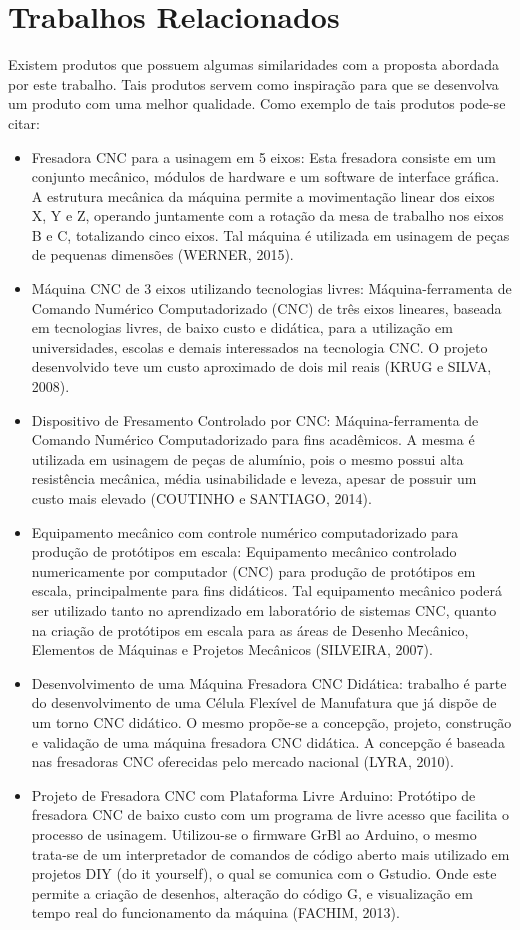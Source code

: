 \section{Trabalhos Relacionados}
Existem produtos que possuem algumas similaridades com a proposta abordada por este trabalho. Tais produtos servem como inspiração para que se desenvolva um produto com uma melhor qualidade. Como exemplo de tais produtos pode-se citar:
\begin{itemize}
\item Fresadora CNC para a usinagem em 5 eixos: Esta fresadora consiste em um conjunto mecânico, módulos de hardware e um software de interface gráfica. A estrutura mecânica da máquina permite a movimentação linear dos eixos X, Y e Z, operando juntamente com a rotação da mesa de trabalho nos eixos B e C, totalizando cinco eixos. Tal máquina é utilizada em usinagem de peças de pequenas dimensões (WERNER, 2015).
\item Máquina CNC de 3 eixos utilizando tecnologias livres: Máquina-ferramenta de Comando Numérico Computadorizado (CNC) de três eixos lineares, baseada em tecnologias livres, de baixo custo e didática, para a utilização em universidades, escolas e demais interessados na tecnologia CNC. O projeto desenvolvido teve um custo aproximado de dois mil reais (KRUG e SILVA, 2008).
\item Dispositivo de Fresamento Controlado por CNC: Máquina-ferramenta de Comando Numérico Computadorizado para fins acadêmicos. A mesma é utilizada em usinagem de peças de alumínio, pois o mesmo possui alta resistência mecânica, média usinabilidade e leveza, apesar de possuir um custo mais elevado (COUTINHO e SANTIAGO, 2014).
\item Equipamento mecânico com controle numérico computadorizado para produção de protótipos em escala: Equipamento mecânico controlado numericamente por computador (CNC) para produção de protótipos em escala, principalmente para fins didáticos. Tal equipamento mecânico poderá ser utilizado tanto no aprendizado em laboratório de sistemas CNC, quanto na criação de protótipos em escala para as áreas de Desenho Mecânico, Elementos de Máquinas e Projetos Mecânicos (SILVEIRA, 2007).
\item Desenvolvimento de uma Máquina Fresadora CNC Didática: trabalho é parte do desenvolvimento de uma Célula Flexível de Manufatura que já dispõe de um torno CNC didático. O mesmo propõe-se a concepção, projeto, construção e validação de uma máquina fresadora CNC didática. A concepção é baseada nas fresadoras CNC oferecidas pelo mercado nacional (LYRA, 2010).
\item Projeto de Fresadora CNC com Plataforma Livre Arduino: Protótipo de fresadora CNC de baixo custo com um programa de livre acesso que facilita o processo de usinagem. Utilizou-se o firmware GrBl ao Arduino, o mesmo trata-se de um interpretador de comandos de código aberto mais utilizado em projetos DIY (do it yourself), o qual se comunica com o Gstudio. Onde este permite a criação de desenhos, alteração do código G, e visualização em tempo real do funcionamento da máquina (FACHIM, 2013). 
\end{itemize}    

